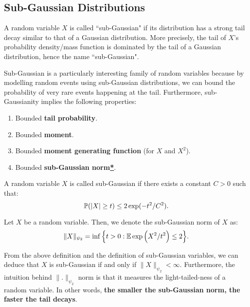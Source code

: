 \subsection{Sub-Gaussian Distributions}
A random variable $X$ is called ``sub-Gaussian" if its distribution has a strong tail decay similar to that of a Gaussian distribution. More precisely, the tail of $X$'s probability density/mass function is dominated by the tail of a Gaussian distribution, hence the name ``sub-Gaussian".

\noindent\newline Sub-Gaussian is a particularly interesting family of random variables because by modelling random events using sub-Gaussian distributions, we can bound the probability of very rare events happening at the tail. Furthermore, sub-Gaussianity implies the following properties:
\begin{enumerate}[label=(\roman*)]
	\item Bounded \textbf{tail probability}.
	\item Bounded \textbf{moment}.
	\item Bounded \textbf{moment generating function} (for $X$ and $X^2$).
	\item Bounded \textbf{sub-Gaussian norm\hyperref[sec:subgaussian_norm]{*}}.
\end{enumerate} 

\begin{definition}
	\label{sec:subgaussian_var}
	A random variable $X$ is called sub-Gaussian if there exists a constant $C>0$ such that:
	\begin{equation}
		\mathbb{P}(|X|\ge t) \le 2\exp(-t^2/C^2).	
	\end{equation} 
\end{definition} 

\begin{definition}
	\label{sec:subgaussian_norm}
	Let $X$ be a random variable. Then, we denote the sub-Gaussian norm of $X$ as:
	\begin{equation}
		\|X\|_{\psi_2} = \inf\Big\{ 
			t > 0: \mathbb{E}\exp\Big( X^2/t^2 \Big)\le 2
		 \Big\}.
	\end{equation} 

	\noindent From the above definition and the definition of sub-Gaussian variables, we can deduce that $X$ is sub-Gaussian if and only if $\|X\|_{\psi_2} < \infty$. Furthermore, the intuition behind $\|.\|_{\psi_2}$ norm is that it measures the light-tailed-ness of a random variable. In other words, \textbf{the smaller the sub-Gaussian norm, the faster the tail decays}.
\end{definition} 

